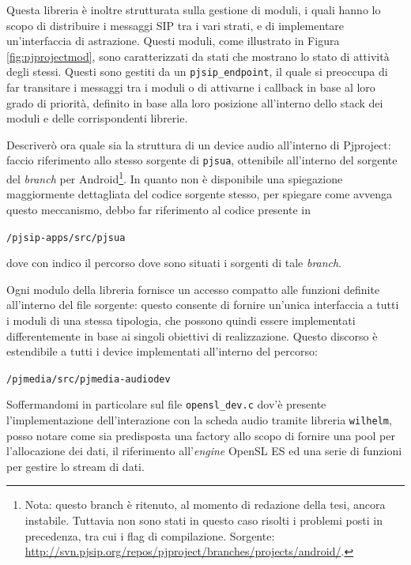 Questa libreria è inoltre strutturata sulla gestione di moduli, i quali hanno
lo scopo di distribuire i messaggi SIP tra i vari strati, e di implementare
un'interfaccia di astrazione. Questi moduli, come illustrato in Figura
\vref{fig:pjprojectmod}, sono caratterizzati da stati che mostrano lo stato
di attività degli stessi. Questi sono gestiti da un \texttt{pjsip\_endpoint}, il 
quale si preoccupa di far transitare i messaggi tra i moduli o di attivarne
i callback in base al loro grado di priorità, definito in base alla loro posizione
all'interno dello stack dei moduli e delle corrispondenti librerie.
\medskip

Descriverò ora quale sia la struttura di un device audio all'interno di Pjproject:
faccio riferimento allo stesso sorgente di \texttt{\small pjsua},
ottenibile all'interno del sorgente del \textit{branch} per Android\footnote{Nota:
questo branch è ritenuto, al momento di redazione della tesi, ancora instabile.
Tuttavia non sono stati in questo caso risolti i problemi posti in precedenza,
tra cui i flag di compilazione. Sorgente: \url{http://svn.pjsip.org/repos/pjproject/branches/projects/android/}.}.
In quanto non è disponibile una spiegazione maggiormente dettagliata del codice
sorgente stesso, per spiegare come avvenga questo meccanismo, debbo far riferimento
al codice presente in
\begin{center}
\texttt{\small \PJA/pjsip-apps/src/pjsua}
\end{center}
dove con \texttt{\small \PJA} indico il percorso dove sono situati i sorgenti di 
tale \textit{branch}. 

Ogni modulo della libreria fornisce un accesso compatto alle funzioni definite
all'interno del file sorgente: questo consente di fornire un'unica interfaccia a tutti 
i moduli di una stessa tipologia, che possono quindi essere implementati differentemente
in base ai singoli obiettivi di realizzazione. Questo discorso è estendibile a tutti
i device implementati all'interno del percorso:
\begin{center}
\texttt{\small \PJA/pjmedia/src/pjmedia-audiodev}
\end{center}
Soffermandomi in particolare sul file \texttt{\small opensl\_dev.c} dov'è presente
l'implementazione dell'interazione con la scheda audio tramite libreria
\texttt{\small wilhelm}, posso notare come sia predisposta una factory 
allo scopo di fornire una pool per l'allocazione dei dati, il riferimento
all'\textit{engine} OpenSL ES ed una serie di funzioni per gestire lo stream di
dati.

